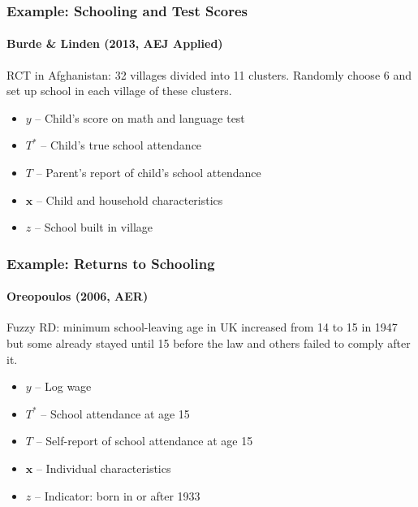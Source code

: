 \documentclass{beamer}
\begin{document}
\begin{frame}
  \frametitle{Example: Schooling and Test Scores}
\framesubtitle{Burde \& Linden (2013, AEJ Applied)}
  RCT in Afghanistan: 32 villages divided into 11 clusters. Randomly choose 6 and set up school in each village of these clusters.

\begin{itemize}
  \item $y$ -- Child's score on math and language test 
  \item $T^*$ -- Child's true school attendance
  \item $T$ -- Parent's report of child's school attendance
  \item $\mathbf{x}$ -- Child and household characteristics
  \item $z$ -- School built in village
\end{itemize}
\end{frame}
%
%   
\begin{frame}
  \frametitle{Example: Returns to Schooling} 
\framesubtitle{Oreopoulos (2006, AER)}
Fuzzy RD: minimum school-leaving age in UK increased from 14 to 15 in 1947 but some already stayed until 15 before the law and others failed to comply after it.
\begin{itemize}
  \item $y$ -- Log wage 
  \item $T^*$ -- School attendance at age 15
  \item $T$ -- Self-report of school attendance at age 15
  \item $\mathbf{x}$ -- Individual characteristics
  \item $z$ -- Indicator: born in or after 1933
\end{itemize}
   
\end{frame}
\end{document}
